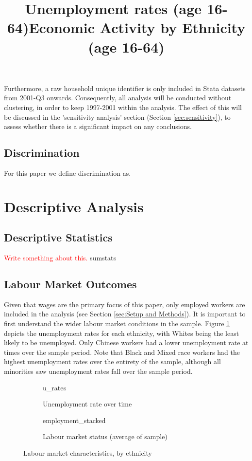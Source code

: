 \documentclass[class=article, crop=false]{standalone}
\begin{document}
Furthermore, a raw household unique identifier is only included in Stata datasets from 2001-Q3 onwards. Consequently, all analysis will be conducted without clustering, in order to keep 1997-2001 within the analysis. The effect of this will be discussed in the 'sensitivity analysis' section (Section \ref{sec:sensitivity}), to assess whether there is a significant impact on any conclusions.

\subsection{Discrimination}
\label{sec:Discrimination}
For this paper we define discrimination as.


\section{Descriptive Analysis}
\label{sec:Descriptive Analysis}
\subsection{Descriptive Statistics}
\label{sec:Descriptive Statistics}
\textcolor{red}{Write something about this.}
{sumstats}

\subsection{Labour Market Outcomes}
\label{sec:Labour Market Outcomes}
Given that wages are the primary focus of this paper, only employed workers are included in the analysis (see Section \ref{sec:Setup and Methods}). It is important to first understand the wider labour market conditions in the sample. Figure \ref{fig:u_rates} depicts the unemployment rates for each ethnicity, with Whites being the least likely to be unemployed. Only Chinese workers had a lower unemployment rate at times over the sample period. Note that Black and Mixed race workers had the highest unemployment rates over the entirety of the sample, although all minorities saw unemployment rates fall over the sample period.
\begin{figure}
\begin{subfigure}{0.5\textwidth}
\centering
    \title{Unemployment rates (age 16-64)}
    {u_rates}
    \caption{Unemployment rate over time}
    \label{fig:u_rates}
\end{subfigure}
\begin{subfigure}{0.5\textwidth}
\centering
    \title{Economic Activity by Ethnicity (age 16-64)}
    {employment_stacked}
    \caption{Labour market status (average of sample)}
    \label{fig:employment_stacked}
\end{subfigure}
\caption{Labour market characteristics, by ethnicity}
\label{fig:labour_market}
\end{figure}
\end{document}
